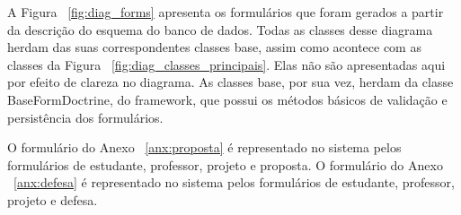 A Figura ~\ref{fig:diag_forms} apresenta os formulários que foram gerados a partir da descrição 
do esquema do banco de dados. Todas as classes desse diagrama herdam das suas correspondentes 
classes base, assim como acontece com as classes da Figura ~\ref{fig:diag_classes_principais}.
Elas não são apresentadas aqui por efeito de clareza no diagrama. As classes base, por sua vez,
herdam da classe BaseFormDoctrine, do framework, que possui os métodos básicos de validação e 
persistência dos formulários. 

O formulário do Anexo ~\ref{anx:proposta} é representado no sistema pelos formulários de estudante, 
professor, projeto e proposta. O formulário do Anexo ~\ref{anx:defesa} é representado no sistema 
pelos formulários de estudante, professor, projeto e defesa. 



